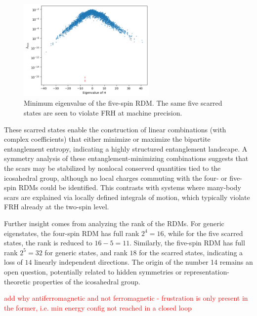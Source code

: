 \documentclass{article}
\begin{document}
\begin{figure}[h!]
    \centering
    \includegraphics[width=0.6\textwidth]{5spins.png}
    \caption{Minimum eigenvalue of the five-spin RDM. The same five scarred states are seen to violate FRH at machine precision.}
    \label{fig:5spins}
\end{figure}

These scarred states enable the construction of linear combinations (with complex coefficients) that either minimize or maximize the bipartite entanglement entropy, indicating a highly structured entanglement landscape. A symmetry analysis of these entanglement-minimizing combinations suggests that the scars may be stabilized by nonlocal conserved quantities tied to the icosahedral group, although no local charges commuting with the four- or five-spin RDMs could be identified. This contrasts with systems where many-body scars are explained via locally defined integrals of motion, which typically violate FRH already at the two-spin level.

Further insight comes from analyzing the rank of the RDMs. For generic eigenstates, the four-spin RDM has full rank $2^4 = 16$, while for the five scarred states, the rank is reduced to $16 - 5 = 11$. Similarly, the five-spin RDM has full rank $2^5 = 32$ for generic states, and rank $18$ for the scarred states, indicating a loss of $14$ linearly independent directions. The origin of the number 14 remains an open question, potentially related to hidden symmetries or representation-theoretic properties of the icosahedral group.

\textcolor{red}{add why antiferromagnetic and not ferromagnetic - frustration is only present in the former, i.e. min energy config not reached in a closed loop}
\end{document}

